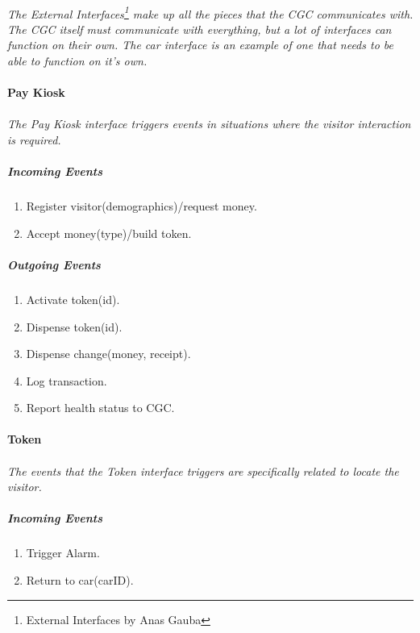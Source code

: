 \documentclass[12pt]{article}
\begin{document}
    \paragraph{} \textit{The External Interfaces\footnote{External Interfaces by Anas Gauba} 
    make up all the pieces that the CGC communicates with. The CGC itself must 
    communicate with everything, 	but a lot of interfaces can function on their own. The
    car interface is an example of one that needs to be able to function on it's own.}
        
    \paragraph{Pay Kiosk}
    \paragraph {}\textit{The Pay Kiosk interface triggers events in situations where the visitor interaction is required.  }
        \subparagraph{Incoming Events}
        \begin{enumerate}
            \item Register visitor(demographics)/request money.
            \item Accept money(type)/build token.
        \end{enumerate}
                
        \subparagraph{Outgoing Events}
        \begin{enumerate}
            \item Activate token(id).
            \item Dispense token(id). 
            \item Dispense change(money, receipt).
            \item Log transaction. 
            \item Report health status to CGC. 
        \end{enumerate}

    \paragraph{Token}
    \paragraph {}\textit{The events that the Token interface triggers are specifically related to locate the visitor.  }
        \subparagraph{Incoming Events}
        \begin{enumerate}
            \item Trigger Alarm. 
            \item Return to car(carID). 
        \end{enumerate}
                
\end{document}
